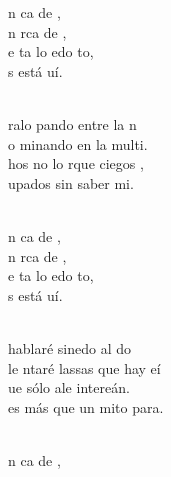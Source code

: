 \begin{cancion}%
	\begin{chorus}%
	n ca de , \\
	n rca de ,\\
	e ta lo edo to,\\
	s está uí.\\
	\end{chorus}%
	\jump\\
	ralo pando entre la n\\
	o minando en la multi.\\
	hos no lo  rque ciegos ,\\
	upados sin saber mi.\\\jump\\
	\begin{chorus}%
	n ca de , \\
	n rca de ,\\
	e ta lo edo to,\\
	s está uí.\\
	\end{chorus}%
	\jump\\
	 hablaré sinedo al do\\
	le ntaré lassas que hay eí\\
	ue sólo ale intereán.\\
	 es más que un mito para.\\\jump\\
	\begin{chorus}%
	n ca de , \\

\end{chorus}
\end{cancion}
